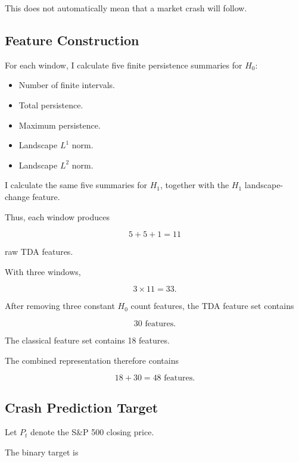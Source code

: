\documentclass[oneside,english,11pt]{article}
\renewcommand{\boxed}[1]{#1}
\begin{document}
This does not automatically mean that a
market crash will follow.

\subsection{Feature Construction}

For each window, I calculate five finite
persistence summaries for $H_0$:

\begin{itemize}
\item Number of finite intervals.
\item Total persistence.
\item Maximum persistence.
\item Landscape $L^1$ norm.
\item Landscape $L^2$ norm.
\end{itemize}

I calculate the same five summaries for $H_1$,
together with the $H_1$ landscape-change feature.

Thus, each window produces

\begin{equation}
5+5+1=11
\end{equation}

raw TDA features.

With three windows,

\begin{equation}
3\times11=33.
\end{equation}

After removing three constant $H_0$ count
features, the TDA feature set contains

\begin{equation}
\boxed{30\text{ features}.}
\end{equation}

The classical feature set contains 18 features.

The combined representation therefore contains

\begin{equation}
\boxed{
18+30=48\text{ features}.
}
\end{equation}

\subsection{Crash Prediction Target}

Let $P_t$ denote the S\&P 500 closing price.

The binary target is
\end{document}
